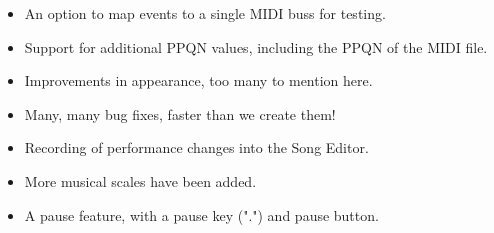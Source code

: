 \documentclass[
 11pt,
 twoside,
 a4paper,
 headinclude,
 footinclude,
 final                                 %
]{article}
\begin{document}
\begin{itemize}
      \item An option to map events to a single MIDI buss for testing.
      \item Support for additional PPQN values, including
         the PPQN of the MIDI file.
      \item Improvements in appearance, too many to mention here.
      \item Many, many bug fixes, faster than we create them!
      \item Recording of performance changes into the Song Editor.
      \item More musical scales
         have been added.
      \item A pause feature, with a pause key (".") and pause button.

\end{itemize}
\end{document}
